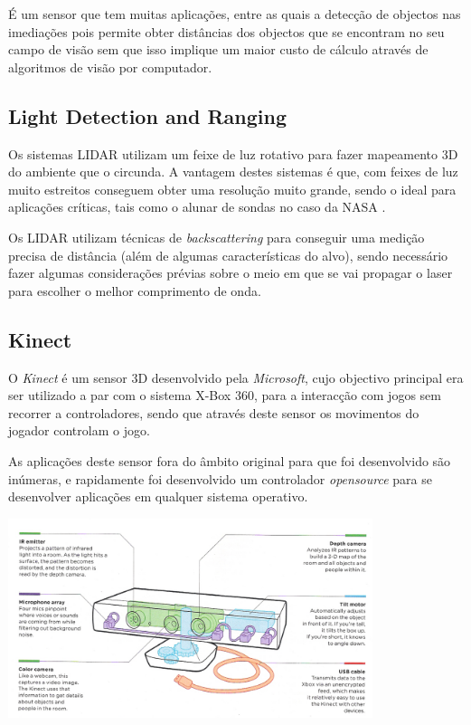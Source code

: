 É um sensor que tem muitas aplicações, entre as quais a detecção de objectos nas imediações
pois permite obter distâncias dos objectos que se encontram no seu campo
de visão sem que isso implique um maior custo de cálculo através de algoritmos
de visão por computador. 

\subsection[LIDAR]{Light Detection and Ranging}

Os sistemas LIDAR utilizam um feixe de luz rotativo para fazer mapeamento 3D
do ambiente que o circunda. A vantagem destes sistemas é que, com feixes de
luz muito estreitos conseguem obter uma resolução muito grande, sendo o ideal
para aplicações críticas, tais como o alunar de sondas no caso da NASA \cite{Keim2010}.

Os LIDAR utilizam técnicas de \emph{backscattering} para conseguir uma medição
precisa de distância (além de algumas características do alvo), sendo necessário
fazer algumas considerações prévias sobre o meio em que se vai propagar o laser
para escolher o melhor comprimento de onda.


\subsection{Kinect}
O \emph{Kinect} é um sensor 3D desenvolvido pela \emph{Microsoft}, cujo objectivo principal era
ser utilizado a par com o sistema X-Box 360, para a interacção com jogos sem recorrer
a controladores, sendo que através deste sensor os movimentos do jogador controlam o
jogo.

As aplicações deste sensor fora do âmbito original para que foi desenvolvido são inúmeras,
e rapidamente foi desenvolvido um controlador \emph{opensource} para se desenvolver aplicações
em qualquer sistema operativo.

\begin{center}
	\includegraphics[width=0.80\textwidth]{figures/Kinect.png}
	\label{fig:5}
\end{center}

